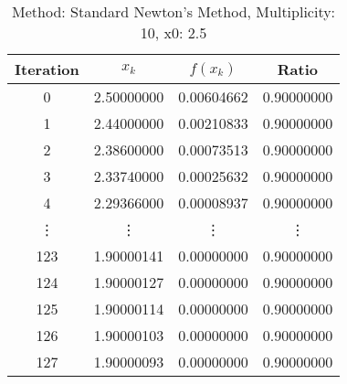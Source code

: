 \begin{table}
\centering
\caption{Method: Standard Newton's Method, Multiplicity: 10, x0: 2.5}
\label{tab:table_Standard_Newton's_Method_10_2_5}
\begin{tabular}{c c c c}
\toprule
Iteration &      $x_k$ &   $f(x_k)$ &      Ratio \\
\midrule
        0 & 2.50000000 & 0.00604662 & 0.90000000 \\
        1 & 2.44000000 & 0.00210833 & 0.90000000 \\
        2 & 2.38600000 & 0.00073513 & 0.90000000 \\
        3 & 2.33740000 & 0.00025632 & 0.90000000 \\
        4 & 2.29366000 & 0.00008937 & 0.90000000 \\
   \vdots &     \vdots &     \vdots &     \vdots \\
      123 & 1.90000141 & 0.00000000 & 0.90000000 \\
      124 & 1.90000127 & 0.00000000 & 0.90000000 \\
      125 & 1.90000114 & 0.00000000 & 0.90000000 \\
      126 & 1.90000103 & 0.00000000 & 0.90000000 \\
      127 & 1.90000093 & 0.00000000 & 0.90000000 \\
\bottomrule
\end{tabular}
\end{table}
